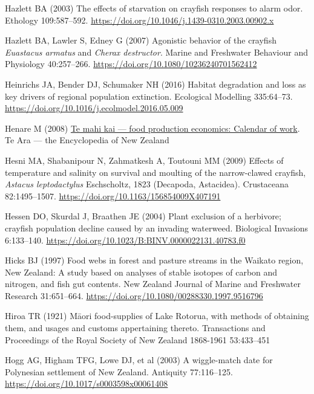 \documentclass[
  12pt,
  a4paper,
]{scrbook}
\newlength{\cslhangindent}
\newenvironment{CSLReferences}[2] %
 {\begin{list}{}{%
  \setlength{\itemindent}{0pt}
  \setlength{\leftmargin}{0pt}
  \setlength{\parsep}{0pt}
  \ifodd #1
   \setlength{\leftmargin}{\cslhangindent}
   \setlength{\itemindent}{-1\cslhangindent}
  \fi
  \setlength{\itemsep}{#2\baselineskip}}}
 {\end{list}}
\begin{document}
\begin{CSLReferences}{1}{1}
Hazlett BA (2003) The effects of starvation on crayfish responses to
alarm odor. Ethology 109:587--592.
\url{https://doi.org/10.1046/j.1439-0310.2003.00902.x}

Hazlett BA, Lawler S, Edney G (2007) Agonistic behavior of the crayfish
{\emph{Euastacus armatus}} and {\emph{Cherax destructor}}. Marine and
Freshwater Behaviour and Physiology 40:257--266.
\url{https://doi.org/10.1080/10236240701562412}

Heinrichs JA, Bender DJ, Schumaker NH (2016) Habitat degradation and
loss as key drivers of regional population extinction. Ecological
Modelling 335:64--73.
\url{https://doi.org/10.1016/j.ecolmodel.2016.05.009}

Henare M (2008)
\href{https://teara.govt.nz/en/interactive/20264/maori-harvesting-seasons}{Te
mahi kai --- food production economics: Calendar of work}. Te Ara ---
the Encyclopedia of {New Zealand}

Hesni MA, Shabanipour N, Zahmatkesh A, Toutouni MM (2009) Effects of
temperature and salinity on survival and moulting of the narrow-clawed
crayfish, {\emph{Astacus leptodactylus}} {Eschscholtz}, 1823
({Decapoda}, {Astacidea}). Crustaceana 82:1495--1507.
\url{https://doi.org/10.1163/156854009X407191}

Hessen DO, Skurdal J, Braathen JE (2004) Plant exclusion of a herbivore;
crayfish population decline caused by an invading waterweed. Biological
Invasions 6:133--140.
\url{https://doi.org/10.1023/B:BINV.0000022131.40783.f0}

Hicks BJ (1997) Food webs in forest and pasture streams in the {Waikato}
region, {New Zealand}: A study based on analyses of stable isotopes of
carbon and nitrogen, and fish gut contents. New Zealand Journal of
Marine and Freshwater Research 31:651--664.
\url{https://doi.org/10.1080/00288330.1997.9516796}

Hiroa TR (1921) M{ā}ori food-supplies of {Lake Rotorua}, with methods of
obtaining them, and usages and customs appertaining thereto.
Transactions and Proceedings of the Royal Society of New Zealand
1868-1961 53:433--451

Hogg AG, Higham TFG, Lowe DJ, et al (2003) A wiggle-match date for
{Polynesian} settlement of {New Zealand}. Antiquity 77:116--125.
\url{https://doi.org/10.1017/s0003598x00061408}


\end{CSLReferences}
\end{document}
